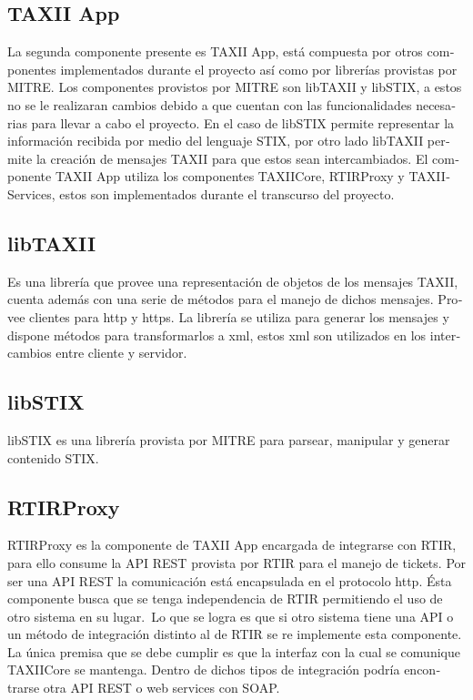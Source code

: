 \documentclass[11pt]{article}
\begin{document}
\bigskip

\subsection[TAXII App\ \ \ \ \ \ \ \ ]{\foreignlanguage{spanish}{TAXII App\ \ \ \ \ \ \ \ }}

\bigskip

\foreignlanguage{spanish}{La segunda componente presente es TAXII App, está compuesta por otros componentes
implementados durante el proyecto así como por librerías provistas por MITRE. Los componentes provistos por MITRE son
libTAXII y libSTIX, a estos no se le realizaran cambios debido a que cuentan con las funcionalidades necesarias para
llevar a cabo el proyecto. En el caso de libSTIX permite representar la información recibida por medio del lenguaje
STIX, por otro lado libTAXII permite la creación de mensajes TAXII para que estos sean intercambiados. El componente
TAXII App utiliza los componentes TAXIICore, RTIRProxy y TAXIIServices, estos son implementados durante el transcurso
del proyecto. }

\subsection[libTAXII]{\foreignlanguage{spanish}{libTAXII}}
\foreignlanguage{spanish}{Es una librería que provee una representación de objetos de los mensajes TAXII, cuenta además
con una serie de métodos para el manejo de dichos mensajes. Provee clientes para http y https. La librería se utiliza
para generar los mensajes y dispone métodos para transformarlos a xml, estos xml son utilizados en los intercambios
entre cliente y servidor.}

\subsection[libSTIX]{\foreignlanguage{spanish}{libSTIX}}
\foreignlanguage{spanish}{libSTIX es una librería provista por MITRE para parsear, manipular y generar contenido STIX.}

\subsection[RTIRProxy]{\foreignlanguage{spanish}{RTIRProxy}}
\foreignlanguage{spanish}{RTIRProxy es la componente de TAXII App encargada de integrarse con RTIR, para ello consume la
API REST provista por RTIR para el manejo de tickets. Por ser una API REST la comunicación está encapsulada en el
protocolo http. Ésta componente busca que se tenga independencia de RTIR permitiendo el uso de otro sistema en su
lugar.}\textstyleannotationreference{ }\foreignlanguage{spanish}{\ Lo que se logra es que si otro sistema tiene una API
o un método de integración distinto al de RTIR se re implemente esta componente. La única premisa que se debe cumplir
es que la interfaz con la cual se comunique TAXIICore se mantenga. Dentro de dichos tipos de integración podría
encontrarse otra API REST o web services con SOAP. }
\end{document}
